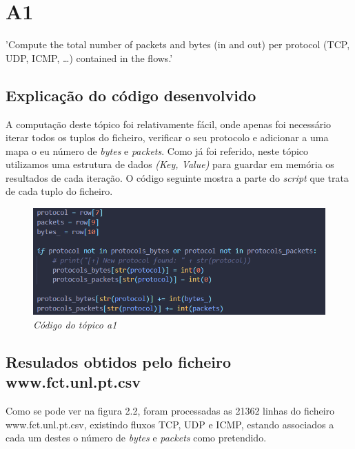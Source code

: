 \chapter{A1}

{\LARGE 'Compute the total number of packets and bytes (in and out) per protocol (TCP, UDP, ICMP, …) contained in the flows.'}

\section{Explicação do código desenvolvido}

A computação deste tópico foi relativamente fácil, onde apenas foi necessário iterar todos os tuplos do ficheiro, verificar o seu protocolo e adicionar a uma mapa o eu número de \textit{bytes} e \textit{packets}. Como já foi referido, neste tópico utilizamos uma estrutura de dados \textit{(Key, Value)} para guardar em memória os resultados de cada iteração. O código seguinte mostra a parte do \textit{script} que trata de cada tuplo do ficheiro.

\begin{figure}[h]
    \label{high}
    \centering
    \includegraphics[width=1\textwidth]{Images/a1/a1.png}
    \caption{\textit{Código do tópico a1}}
\end{figure}


\clearpage

\section{Resulados obtidos pelo ficheiro www.fct.unl.pt.csv}

Como se pode ver na figura 2.2, foram processadas as 21362 linhas do ficheiro www.fct.unl.pt.csv, existindo fluxos TCP, UDP e ICMP, estando associados a cada um destes o número de \textit{bytes} e \textit{packets} como pretendido.

